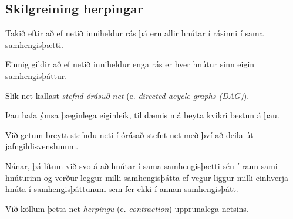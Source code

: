 \subsection{Skilgreining herpingar}
{
    {
        \item<1-> Takið eftir að ef netið inniheldur rás þá eru allir hnútar í rásinni í sama samhengisþætti.
        \item<2-> Einnig gildir að ef netið inniheldur enga rás er hver hnútur sinn eigin samhengisþáttur.
        \item<3-> Slík net kallast \emph{stefnd órásuð net} (e. \emph{directed acycle graphs (DAG)}).
        \item<4-> Þau hafa ýmsa þæginlega eiginleik, til dæmis má beyta kvikri bestun á þau.
        \item<5-> Við getum breytt stefndu neti í órásað stefnt net með því að deila út jafngildisvenslunum.
        \item<6-> Nánar, þá lítum við svo á að hnútar í sama samhengisþætti séu í raun sami hnúturinn
                    og verður leggur milli samhengisþátta ef vegur liggur milli einhverja hnúta í samhengisþáttunum sem fer ekki í annan samhengisþátt.
        \item<7-> Við köllum þetta net \emph{herpingu} (e. \emph{contraction}) upprunalega netsins.
    }
}

